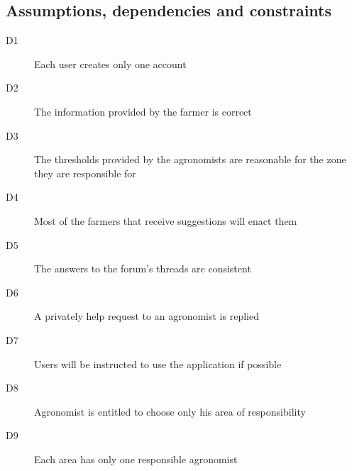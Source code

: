 \subsection{Assumptions, dependencies and constraints}
\begin{description}
    \item[D1] Each user creates only one account
    \item[D2] The information provided by the farmer is correct
    \item[D3] The thresholds provided by the agronomists are reasonable for the zone they are responsible for
    \item[D4] Most of the farmers that receive suggestions will enact them
    \item[D5] The answers to the forum's threads are consistent
    \item[D6] A privately help request to an agronomist is replied
    \item[D7] Users will be instructed to use the application if possible
    \item[D8] Agronomist is entitled to choose only his area of responsibility
    \item[D9] Each area has only one responsible agronomist 
\end{description}